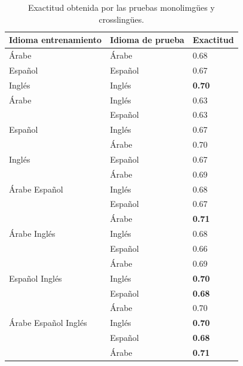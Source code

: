 \documentclass[runningheads]{llncs}
\begin{document}
\begin{table}[]
\centering
\caption{Exactitud obtenida por las pruebas monolimgües y crosslingües.}
\label{results_accuracy}
\begin{tabular}{|l|l|l|}
\hline
Idioma entrenamiento & Idioma de prueba & Exactitud \\ \hline
Árabe                & Árabe            & 0.68      \\ \hline
Español              & Español          & 0.67      \\ \hline
Inglés               & Inglés           & \textbf{0.70}      \\ \hline
Árabe                & Inglés           & 0.63      \\ \cline{2-3} 
                     & Español          & 0.63      \\ \hline
Español              & Inglés           & 0.67      \\ \cline{2-3} 
                     & Árabe            & 0.70      \\ \hline
Inglés               & Español          & 0.67      \\ \cline{2-3} 
                     & Árabe            & 0.69      \\ \hline
Árabe Español        & Inglés           & 0.68      \\ \cline{2-3} 
                     & Español          & 0.67      \\ \cline{2-3} 
                     & Árabe            & \textbf{0.71}      \\ \hline
Árabe Inglés         & Inglés           & 0.68      \\ \cline{2-3} 
                     & Español          & 0.66      \\ \cline{2-3} 
                     & Árabe            & 0.69      \\ \hline
Español Inglés       & Inglés           & \textbf{0.70}      \\ \cline{2-3} 
                     & Español          & \textbf{0.68}      \\ \cline{2-3} 
                     & Árabe            & 0.70      \\ \hline
Árabe Español Inglés & Inglés           & \textbf{0.70}      \\ \cline{2-3} 
                     & Español          & \textbf{0.68}      \\ \cline{2-3} 
                     & Árabe            & \textbf{0.71}      \\ \hline
\end{tabular}
\end{table}
\end{document}
